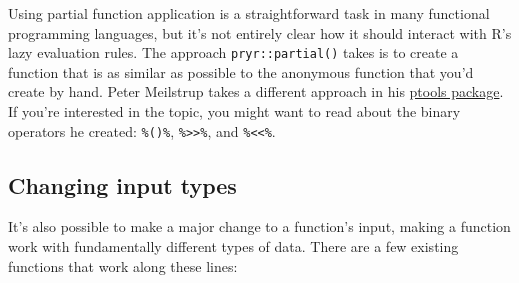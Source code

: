 Using partial function application is a straightforward task in many
functional programming languages, but it's not entirely clear how it
should interact with R's lazy evaluation rules. The approach
\texttt{pryr::partial()} takes is to create a function that is as
similar as possible to the anonymous function that you'd create by hand.
Peter Meilstrup takes a different approach in his
\href{https://github.com/crowding/ptools/}{ptools package}. If you're
interested in the topic, you might want to read about the binary
operators he created: \texttt{\%()\%},
\texttt{\%\textgreater{}\textgreater{}\%}, and
\texttt{\%\textless{}\textless{}\%}.

\hypertarget{changing-input-types}{%
\subsection{Changing input types}\label{changing-input-types}}

It's also possible to make a major change to a function's input, making
a function work with fundamentally different types of data. There are a
few existing functions that work along these lines:

